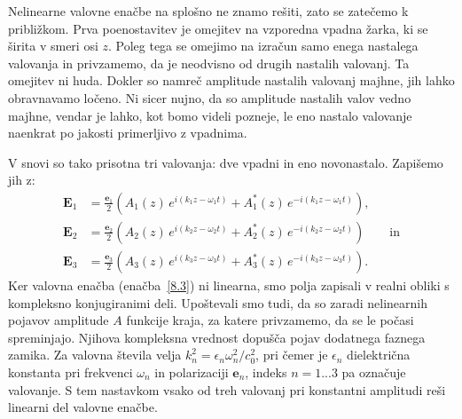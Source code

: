 Nelinearne valovne enačbe na splošno ne znamo rešiti, zato se zatečemo k približkom.
Prva poenostavitev je omejitev na vzporedna vpadna žarka,
ki se širita v smeri osi $z$. Poleg tega se omejimo na izračun samo enega
nastalega valovanja in privzamemo, da je neodvisno od drugih nastalih valovanj.
Ta omejitev ni huda. Dokler so namreč amplitude nastalih valovanj majhne, 
jih lahko obravnavamo ločeno. Ni sicer nujno,
da so amplitude nastalih valov vedno majhne, vendar je lahko, kot bomo videli 
pozneje, le eno nastalo valovanje naenkrat po jakosti primerljivo z vpadnima. 

V snovi so tako prisotna tri valovanja:
dve vpadni in eno novonastalo. Zapišemo jih z: 
\begin{align}
\mathbf{E}_{1} & =  \frac{\mathbf{e}_{1}}{2}\left(A_{1}(z)\, 
e^{i(k_{1}z-\omega_{1}t)}+A_{1}^{*}(z)\, e^{-i(k_{1}z-\omega_{1}t)}\right)\!\!,\nonumber \\
\mathbf{E}_{2} & =  \frac{\mathbf{e}_{2}}{2}\left(A_{2}(z)\, 
e^{i(k_{2}z-\omega_{2}t)}+A_{2}^{*}(z)\, e^{-i(k_{2}z-\omega_{2}t)}\right) \qquad \mathrm{in} \nonumber \\
\mathbf{E}_{3} & =  \frac{\mathbf{e}_{3}}{2}\left(A_{3}(z)\, 
e^{i(k_{3}z-\omega_{3}t)}+A_{3}^{*}(z)\, e^{-i(k_{3}z-\omega_{3}t)}\right)\!\!.
\end{align}
Ker valovna enačba (enačba~\ref{8.3}) ni linearna, smo polja 
zapisali v realni obliki s kompleksno konjugiranimi
deli. Upoštevali smo tudi,
da so zaradi nelinearnih pojavov amplitude $A$ funkcije kraja, za
katere privzamemo, da se le počasi spreminjajo. Njihova kompleksna vrednost
dopušča pojav dodatnega faznega zamika. Za valovna
števila velja $k_{n}^{2}=\epsilon_{n}\omega_n^{2}/c_0^{2}$,
pri čemer je $\epsilon_{n}$ dielektrična konstanta pri frekvenci
$\omega_{n}$ in polarizaciji $\mathbf{e}_{n}$, indeks $n = 1...3$ pa označuje
valovanje. S tem nastavkom vsako od treh valovanj
pri konstantni amplitudi reši linearni del valovne enačbe. 

